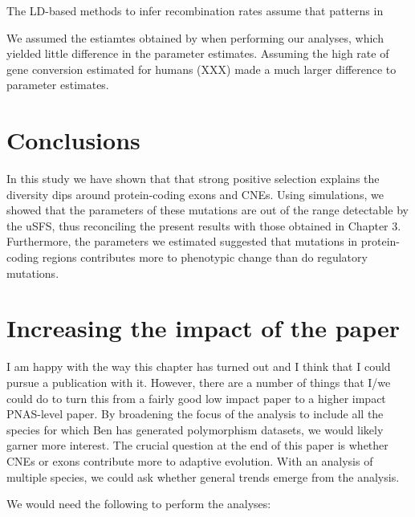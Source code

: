 \documentclass[11pt]{article}
\begin{document}
	The LD-based methods to infer recombination rates assume that patterns in  
	
We assumed the estiamtes obtained by \cite{RN263} when performing our analyses, which yielded little difference in the parameter estimates. Assuming the high rate of gene conversion estimated for humans (XXX) made a much larger difference to parameter estimates.

\section*{Conclusions}

	In this study we have shown that that strong positive selection explains the diversity dips around protein-coding exons and CNEs. Using simulations, we showed that the parameters of these mutations are out of the range detectable by the uSFS, thus reconciling the present results with those obtained in Chapter 3. Furthermore, the parameters we estimated suggested that mutations in protein-coding regions contributes more to phenotypic change than do regulatory mutations. 

\section*{Increasing the impact of the paper}

	I am happy with the way this chapter has turned out and I think that I could pursue a publication with it. However, there are a number of things that I/we could do to turn this from a fairly good low impact paper to a higher impact PNAS-level paper. By broadening the focus of the analysis to include all the species for which Ben has generated polymorphism datasets, we would likely garner more interest. The crucial question at the end of this paper is whether CNEs or exons contribute more to adaptive evolution. With an analysis of multiple species, we could ask whether general trends emerge from the analysis.

	We would need the following to perform the analyses:
	
\end{document}
